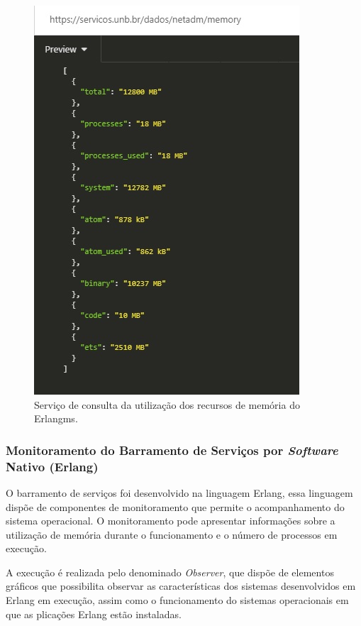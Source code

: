 \begin{figure}[H]
	\begin{center}
	\includegraphics[scale = 0.90]{img/monitoramentoEMS.jpg}
		\caption{Serviço de consulta da utilização dos recursos de memória do Erlangms.}
		\label{fun:fig:memoriaEMS}
	\end{center}
\end{figure}

\subsubsection{Monitoramento do Barramento de Serviços por \textit{Software} Nativo (Erlang)}
O barramento de serviços foi desenvolvido na linguagem Erlang, essa linguagem dispõe de componentes de monitoramento que permite o acompanhamento do sistema operacional. O monitoramento pode apresentar informações sobre a utilização de memória durante o funcionamento e o número de processos em execução. 

A execução é realizada pelo denominado \textit{Observer}, que dispõe de elementos gráficos que possibilita observar as características dos sistemas desenvolvidos em Erlang \cite{ericssonAB2002-2019} em execução, assim como o funcionamento do sistemas operacionais em que as plicações Erlang estão instaladas. 

